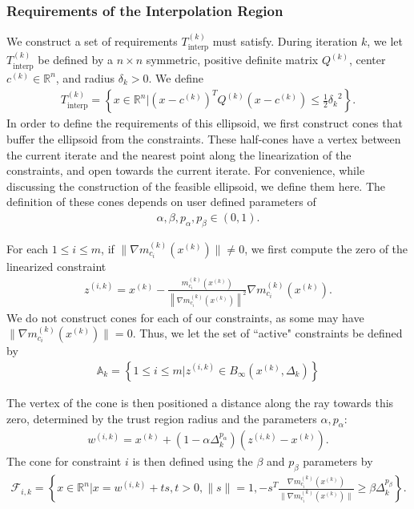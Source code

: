 \documentclass{article}
\theoremstyle{case}
\numberwithin{theorem}{subsection}
\newcommand{\activeconstraintsk}{{\mathbb A_{k}}}
\newcommand{\ck}{{c^{(k)}}}
\newcommand{\dk}{\Delta_k}
\newcommand{\fik}{{\mathcal F_{i, k}}}
\newcommand{\gmcik}{{\nabla m_{c_i}^{(k)}\left(\xk\right)}}
\newcommand{\hgik}{{\frac{\nabla m^{(k)}_{c_i}(\xk)}{\|\nabla m^{(k)}_{c_i}(\xk)\|}}}
\newcommand{\qk}{{Q^{(k)}}}
\newcommand{\Rn}{\mathbb R^n}
\newcommand{\sampletrk}{{T_{\text{interp}}^{(k)}}}
\newcommand{\sdk}{{\delta_k}}
\newcommand{\wik}{{w^{(i, k)}}}
\newcommand{\xk}{{x^{(k)}}}
\newcommand{\zik}{{z^{(i, k)}}}
\begin{document}
\subsubsection{Requirements of the Interpolation Region}
\label{ellipsoid_requirements}
We construct a set of requirements $\sampletrk$ must satisfy.
During iteration $k$, we let $\sampletrk$ be defined by a $n\times n$ symmetric, positive definite matrix $\qk$, center $\ck \in \Rn$, and radius $\delta_{k} > 0$.
We define 
\begin{align*}
\sampletrk = \left \{x \in \Rn | (x - \ck)^T \qk(x - \ck) \le \frac 1 2 \sdk^2 \right \}.
\end{align*}
In order to define the requirements of this ellipsoid, we first construct cones that buffer the ellipsoid from the constraints.
These half-cones have a vertex between the current iterate and the nearest point along the linearization of the constraints, and open towards the current iterate.
For convenience, while discussing the construction of the feasible ellipsoid, we define them here.
The definition of these cones depends on user defined parameters of 
\begin{align}
\alpha, \beta, p_{\alpha}, p_{\beta} \in (0, 1). \label{define_abpab}
\end{align}

For each $1\le i\le m$, if $\|\gmcik\| \ne 0$, we first compute the zero of the linearized constraint
\begin{align}
\zik = \xk - \frac{m^{(k)}_{c_i}(\xk)}{\left\|\gmcik\right\|^2} \gmcik. \label{define_z}
\end{align}
We do not construct cones for each of our constraints, as some may have $\|\gmcik\| = 0$.
Thus, we let the set of ``active" constraints be defined by 
\begin{align}
\activeconstraintsk = \left\{1 \le i \le m | \zik \in B_{\infty}(\xk, \dk)\right\} \label{define_activeconstraints}
\end{align}

The vertex of the cone is then positioned a distance along the ray towards this zero, determined by the trust region radius and the parameters $\alpha, p_{\alpha}$:
\begin{align}
\wik = \xk + \left(1 - \alpha\dk^{p_{\alpha}}\right)\left(\zik - \xk\right). \label{define_w}
\end{align}
The cone for constraint $i$ is then defined using the $\beta$ and $p_{\beta}$ parameters by
\begin{align}
\fik = \left\{x \in \Rn | x = \wik + t s,t > 0, \|s\| = 1, -s^T\hgik \ge \beta \dk^{p_{\beta}} \right\}. \label{define_fik}
\end{align}
\end{document}
